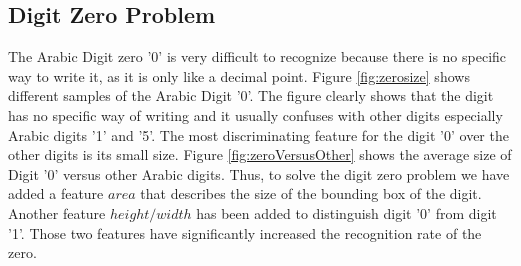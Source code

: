 \documentclass[conference]{IEEEtran}
\begin{document}
\subsection{Digit Zero Problem}
\label{sec:ZeroProblem}
The Arabic Digit zero '0' is very difficult to recognize because there is no specific way to write it, as it is only like a decimal point. Figure \ref{fig:zerosize} shows different samples of the Arabic Digit '0'. The figure clearly shows that the digit has no specific way of writing and it usually confuses with other digits especially Arabic digits '1' and '5'. The most discriminating feature for the digit '0' over the other digits is its small size. Figure \ref{fig:zeroVersusOther} shows the average size of Digit '0' versus other Arabic digits. Thus, to solve the digit zero problem we have added a feature $area$  that describes the size of the bounding box of the digit. Another feature  $height/width$  has been added to distinguish digit '0' from digit '1'. Those two features have significantly increased the recognition rate of the zero.


\end{document}
